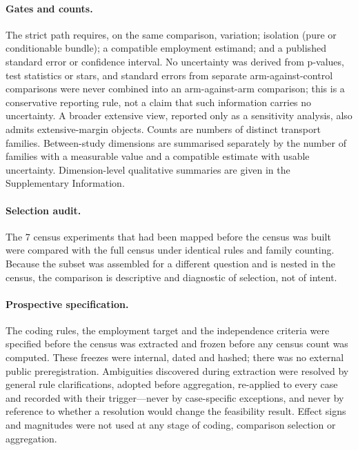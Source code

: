\documentclass[11pt]{article}
\begin{document}
\paragraph{Gates and counts.} The strict path requires, on the same comparison, variation; isolation (pure or conditionable bundle); a compatible employment estimand; and a published standard error or confidence interval. No uncertainty was derived from p-values, test statistics or stars, and standard errors from separate arm-against-control comparisons were never combined into an arm-against-arm comparison; this is a conservative reporting rule, not a claim that such information carries no uncertainty. A broader extensive view, reported only as a sensitivity analysis, also admits extensive-margin objects. Counts are numbers of distinct transport families. Between-study dimensions are summarised separately by the number of families with a measurable value and a compatible estimate with usable uncertainty. Dimension-level qualitative summaries are given in the Supplementary Information.

\paragraph{Selection audit.} The 7 census experiments that had been mapped before the census was built were compared with the full census under identical rules and family counting. %
Because the subset was assembled for a different question and is nested in the census, the comparison is descriptive and diagnostic of selection, not of intent.

\paragraph{Prospective specification.} The coding rules, the employment target and the independence criteria were specified before the census was extracted and frozen before any census count was computed. These freezes were internal, dated and hashed; there was no external public preregistration. Ambiguities discovered during extraction were resolved by general rule clarifications, adopted before aggregation, re-applied to every case and recorded with their trigger---never by case-specific exceptions, and never by reference to whether a resolution would change the feasibility result. Effect signs and magnitudes were not used at any stage of coding, comparison selection or aggregation.
\end{document}
